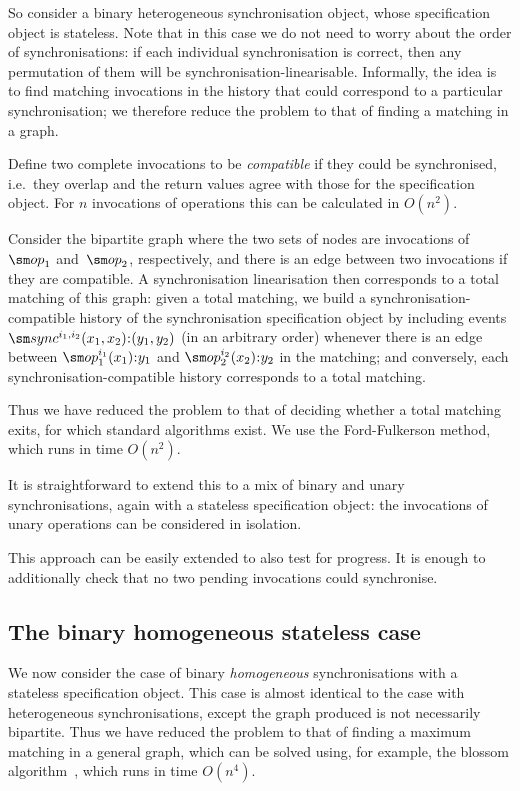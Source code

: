 So consider a binary heterogeneous synchronisation object, whose specification
object is stateless.  Note that in this case we do not need to worry about the
order of synchronisations: if each individual synchronisation is correct, then
any permutation of them will be synchronisation-linearisable.  Informally, the
idea is to find matching invocations in the history that could correspond to a
particular synchronisation; we therefore reduce the problem to that of finding
a matching in a graph.

Define two complete invocations to be \emph{compatible} if they could be
synchronised, i.e.~they overlap and the return values agree with those for the
specification object.  For $n$ invocations of operations this can be
calculated in $O(n^2)$.

Consider the bipartite graph where the two sets of nodes are invocations
of~$\op_1$ and~$\op_2$, respectively, and there is an edge between two
invocations if they are compatible.  A synchronisation linearisation then
corresponds to a total matching of this graph: given a total matching, we
build a synchronisation-compatible history of the synchronisation
specification object by including events
$\sync^{i_1,i_2}(x_1,x_2)\::(y_1,y_2)$ (in an arbitrary order) whenever there
is an edge between $\op_1^{i_1}(x_1)\::y_1$ and $\op_2^{i_2}(x_2)\::y_2$ in
the matching; and conversely, each synchronisation-compatible history
corresponds to a total matching.

Thus we have reduced the problem to that of deciding whether a total matching
exits, for which standard algorithms exist.  We use the Ford-Fulkerson method,
which runs in time $O(n^2)$.

It is straightforward to extend this to a mix of binary and unary
synchronisations, again with a stateless specification object: the invocations
of unary operations can be considered in isolation.  

This approach can be easily extended to also test for progress.  It is enough
to additionally check that no two pending invocations could synchronise.


\subsection{The binary homogeneous stateless case}
\label{sec:binary-homogeneous} 

We now consider the case of binary \emph{homogeneous} synchronisations with a
stateless specification object.  This case is almost identical to the case
with heterogeneous synchronisations, except the graph produced is not
necessarily bipartite.  Thus we have reduced the problem to that of finding a
maximum matching in a general graph, which can be solved using, for example,
the blossom algorithm~\cite{edmonds_1965}, which runs in time $O(n^4)$.
  
